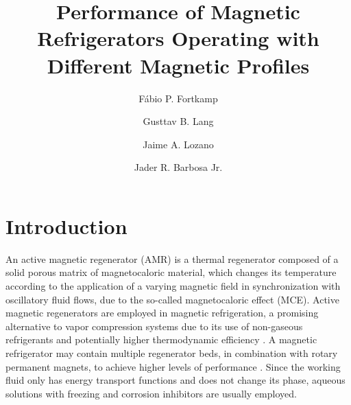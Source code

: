 \documentclass[draft]{svjour3}
\begin{document}
\title{Performance of Magnetic Refrigerators Operating with Different Magnetic Profiles}

\author{
Fábio P. Fortkamp \and
Gusttav B. Lang \and
Jaime A. Lozano \and
Jader R. Barbosa Jr.
}




\date{}


\maketitle

\begin{abstract}


\end{abstract}

\section{Introduction}
\label{sec:introduction}

An active magnetic regenerator (AMR)  is a thermal regenerator composed of a solid porous matrix of magnetocaloric material, which changes its temperature according to the application of a varying magnetic field in synchronization with oscillatory fluid flows, due to the so-called magnetocaloric effect (MCE). Active magnetic regenerators are employed in magnetic refrigeration, a promising alternative to vapor compression systems due to its use of non-gaseous refrigerants and potentially higher  thermodynamic efficiency \cite{bib:trevizoli}. A magnetic refrigerator may contain multiple regenerator beds, in combination with rotary permanent magnets, to achieve higher levels of performance \cite{bib:trevizoli16_pump}. Since the working fluid only has energy transport functions and does not change its phase, aqueous solutions with freezing and corrosion inhibitors are usually employed.
\end{document}
